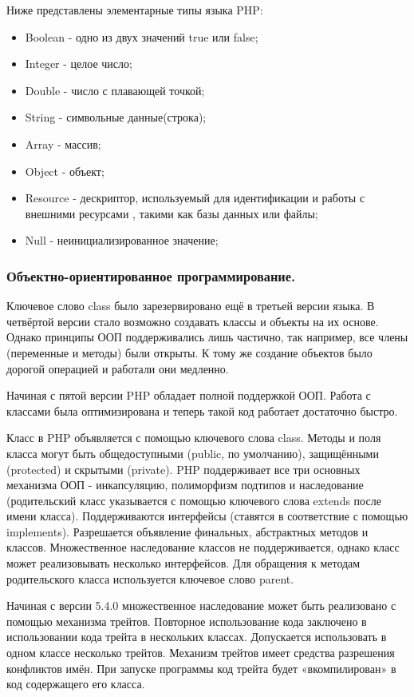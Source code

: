 Ниже представлены элементарные типы языка PHP:
\begin{itemize}
  \item Boolean - одно из двух значений true или false;
  \item Integer - целое число;
  \item Double - число с плавающей точкой;
  \item String - символьные данные(строка);
  \item Array - массив;
  \item Object - объект;
  \item Resource - дескриптор, используемый для идентификации и работы с внешними ресурсами , такими как базы данных или файлы; 
  \item Null - неинициализированное значение;
\end{itemize}


\subsubsection{Объектно-ориентированное программирование. }
\label{sub:practice:oop_php}
Ключевое слово class было зарезервировано ещё в третьей версии языка. В четвёртой версии стало возможно создавать классы и объекты на их основе. Однако принципы ООП поддерживались лишь частично, так например, все члены (переменные и методы) были открыты. К тому же создание объектов было дорогой операцией и работали они медленно.

Начиная с пятой версии PHP обладает полной поддержкой ООП. Работа с классами была оптимизирована и теперь такой код работает достаточно быстро.

Класс в PHP объявляется с помощью ключевого слова class. Методы и поля класса могут быть общедоступными (public, по умолчанию), защищёнными (protected) и скрытыми (private). PHP поддерживает все три основных механизма ООП - инкапсуляцию, полиморфизм подтипов и наследование (родительский класс указывается с помощью ключевого слова extends после имени класса). Поддерживаются интерфейсы (ставятся в соответствие с помощью implements). Разрешается объявление финальных, абстрактных методов и классов. Множественное наследование классов не поддерживается, однако класс может реализовывать несколько интерфейсов. Для обращения к методам родительского класса используется ключевое слово parent.

Начиная с версии 5.4.0 множественное наследование может быть реализовано с помощью механизма трейтов. Повторное использование кода заключено в использовании кода трейта в нескольких классах. Допускается использовать в одном классе несколько трейтов. Механизм трейтов имеет средства разрешения конфликтов имён. При запуске программы код трейта будет «вкомпилирован» в код содержащего его класса.

